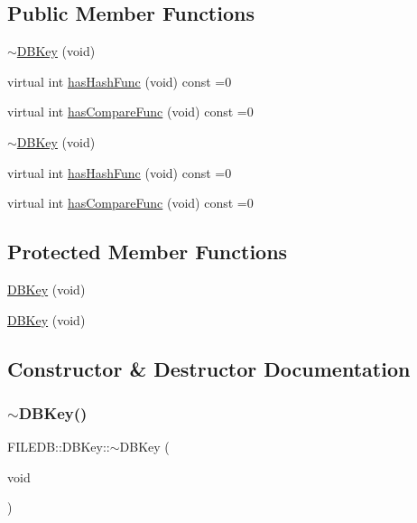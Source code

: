 \subsection*{Public Member Functions}
\begin{DoxyCompactItemize}
\item 
\mbox{\hyperlink{classFILEDB_1_1DBKey_a5f8d52f7400d7723ab1093b46c3fbdf2}{$\sim$\+D\+B\+Key}} (void)
\item 
virtual int \mbox{\hyperlink{classFILEDB_1_1DBKey_a541dab4f4083ae951dee2f30483eb18e}{has\+Hash\+Func}} (void) const =0
\item 
virtual int \mbox{\hyperlink{classFILEDB_1_1DBKey_a416c32ba10caf76e6b7ff4986cfc3c05}{has\+Compare\+Func}} (void) const =0
\item 
\mbox{\hyperlink{classFILEDB_1_1DBKey_a5f8d52f7400d7723ab1093b46c3fbdf2}{$\sim$\+D\+B\+Key}} (void)
\item 
virtual int \mbox{\hyperlink{classFILEDB_1_1DBKey_a541dab4f4083ae951dee2f30483eb18e}{has\+Hash\+Func}} (void) const =0
\item 
virtual int \mbox{\hyperlink{classFILEDB_1_1DBKey_a416c32ba10caf76e6b7ff4986cfc3c05}{has\+Compare\+Func}} (void) const =0
\end{DoxyCompactItemize}
\subsection*{Protected Member Functions}
\begin{DoxyCompactItemize}
\item 
\mbox{\hyperlink{classFILEDB_1_1DBKey_a9cd02eea470fc674d8f237a1919168cf}{D\+B\+Key}} (void)
\item 
\mbox{\hyperlink{classFILEDB_1_1DBKey_a9cd02eea470fc674d8f237a1919168cf}{D\+B\+Key}} (void)
\end{DoxyCompactItemize}


\subsection{Constructor \& Destructor Documentation}
\mbox{\label{classFILEDB_1_1DBKey_a5f8d52f7400d7723ab1093b46c3fbdf2}} 
\subsubsection{\texorpdfstring{$\sim$DBKey()}{~DBKey()}\hspace{0.1cm}{\footnotesize\ttfamily [1/2]}}
{\footnotesize\ttfamily F\+I\+L\+E\+D\+B\+::\+D\+B\+Key\+::$\sim$\+D\+B\+Key (\begin{DoxyParamCaption}\item[{void}]{ }\end{DoxyParamCaption})\hspace{0.3cm}{\ttfamily [inline]}}

